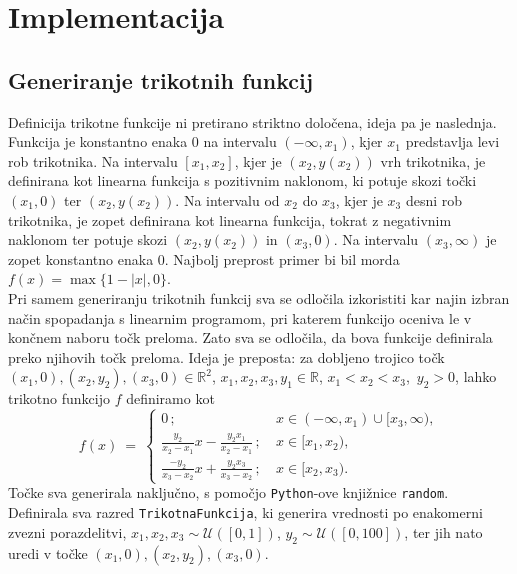 \documentclass[11pt]{article}
\theoremstyle{definition}
\newcommand{\R}{\mathbb{R}}
\newcommand{\1}{\mathbbm{1}}
\newcommand{\set}[1]{\{#1\}}
\begin{document}
\section{Implementacija}
\vspace{0.5cm}


\subsection{Generiranje trikotnih funkcij}
\vspace{0.5cm}

Definicija trikotne funkcije ni pretirano striktno določena, ideja pa je naslednja. 
Funkcija je konstantno enaka $0$ na intervalu $(-\infty, x_1)$, kjer $x_1$ predstavlja levi rob trikotnika. 
Na intervalu $[x_1, x_2]$, kjer je $(x_2,y(x_2))$ vrh trikotnika, je definirana kot linearna funkcija s pozitivnim naklonom, ki potuje skozi točki $(x_1,0)$ ter $(x_2,y(x_2))$. 
Na intervalu od $x_2$ do $x_3$, kjer je $x_3$ desni rob trikotnika, je zopet definirana kot linearna funkcija, tokrat z negativnim naklonom ter potuje skozi $(x_2,y(x_2))$ in $(x_3,0)$. 
Na intervalu $(x_3,\infty)$ je zopet konstantno enaka $0$. Najbolj preprost primer bi bil morda $f(x) = \max\set{1-|x|,0}$. \\

Pri samem generiranju trikotnih funkcij sva se odločila izkoristiti kar najin izbran način spopadanja s linearnim programom, pri katerem funkcijo oceniva le v končnem naboru točk preloma. Zato sva se odločila, da bova funkcije definirala preko njihovih točk preloma. Ideja je preposta: za dobljeno trojico točk $(x_1, 0),(x_2, y_2),(x_3,0) \in \R^2$, $x_1,x_2,x_3,y_1 \in \R$, \hbox{$x_1<x_2<x_3$, $y_2>0$,} lahko trikotno funkcijo $f$ definiramo kot
$$f(x) ~=~ \begin{cases}
0\,; ~&x \in (-\infty,x_1)\cup[x_3,\infty), \\
\frac{y_2}{x_2-x_1}x - \frac{y_2x_1}{x_2-x_1}\,; ~& x \in [x_1,x_2), \\
\frac{-y_2}{x_3-x_2}x + \frac{y_2x_3}{x_3-x_2}\,; ~& x \in [x_2, x_3).
\end{cases}$$
Točke sva generirala naključno, s pomočjo \texttt{Python}-ove knjižnice \texttt{random}. Definirala sva razred \texttt{TrikotnaFunkcija}, ki generira vrednosti po enakomerni zvezni porazdelitvi, $x_1,x_2,x_3 \sim \mathcal{U}([0,1])$, $y_2 \sim \mathcal{U}([0,100])$, ter jih nato uredi v točke $(x_1,0),(x_2,y_2),(x_3,0)$.
\end{document}
